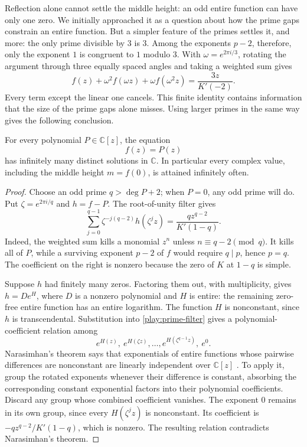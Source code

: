 Reflection alone cannot settle the middle height: an odd entire
function can have only one zero.  We initially approached it as a
question about how the prime gaps constrain an entire function.
But a simpler feature of the primes settles it, and more: the only
prime divisible by $3$ is $3$.  Among the exponents $p-2$, therefore,
only the exponent $1$ is congruent to $1$ modulo $3$.  With
$\omega=e^{2\pi i/3}$, rotating the argument through three equally
spaced angles and taking a weighted sum gives
\[
 f(z)+\omega^2 f(\omega z)+\omega f(\omega^2z)
   =\frac{3z}{K'(-2)}.
\]
Every term except the linear one cancels.  This finite identity
contains information that the size of the prime gaps alone misses.
Using larger primes in the same way gives the following conclusion.

\begin{theorem}
\label{play:midpoint}
For every polynomial $P\in\mathbb C[z]$, the equation
\[
 f(z)=P(z)
\]
has infinitely many distinct solutions in $\mathbb C$.
In particular every complex value, including the middle height
$m=f(0)$, is attained infinitely often.
\end{theorem}
\begin{proof}
Choose an odd prime $q>\deg P+2$; when $P=0$, any odd prime will
do.  Put $\zeta=e^{2\pi i/q}$ and $h=f-P$.
The root-of-unity filter gives
\begin{equation}
 \sum_{j=0}^{q-1}\zeta^{-j(q-2)}h(\zeta^jz)
    =\frac{qz^{q-2}}{K'(1-q)}.
 \label{play:prime-filter}
\end{equation}
Indeed, the weighted sum kills a monomial $z^n$ unless
$n\equiv q-2\pmod q$.  It kills all of $P$, while a surviving
exponent $p-2$ of $f$ would require $q\mid p$, hence $p=q$.
The coefficient on the right is nonzero because the zero of $K$
at $1-q$ is simple.

Suppose $h$ had finitely many zeros.  Factoring them out, with
multiplicity, gives $h=D e^H$, where $D$ is a nonzero polynomial
and $H$ is entire: the remaining zero-free entire function has an
entire logarithm.  The function $H$ is nonconstant, since $h$ is
transcendental.  Substitution into \eqref{play:prime-filter} gives
a polynomial-coefficient relation among
\[
 e^{H(z)},\ e^{H(\zeta z)},\ldots,
 e^{H(\zeta^{q-1}z)},\ e^0.
\]
Narasimhan's theorem says that exponentials of entire functions
whose pairwise differences are nonconstant are linearly independent
over $\mathbb C[z]$ \cite[Theorem 1]{playNarasimhan1971}.
To apply it, group the rotated exponents whenever their difference
is constant, absorbing the corresponding constant exponential
factors into their polynomial coefficients.  Discard any group
whose combined coefficient vanishes.  The exponent $0$ remains
in its own group, since every $H(\zeta^jz)$ is nonconstant.  Its
coefficient is $-qz^{q-2}/K'(1-q)$, which is nonzero.
The resulting relation contradicts Narasimhan's theorem.
\end{proof}

